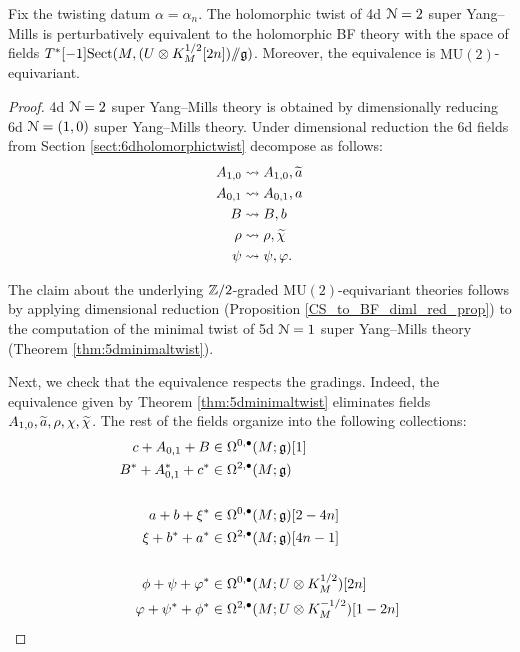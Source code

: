 \documentclass[10pt, oneside]{article}
\newcommand{\MU}{\mathrm{MU}}
\newcommand{\Sect}{\mathrm{Sect}}
\newcommand{\ham}{/\!\!/}
\begin{document}
\begin{theorem}
Fix the twisting datum $\alpha = \alpha_n$. The holomorphic twist of 4d $\cN=2$ super Yang--Mills is perturbatively equivalent to the holomorphic BF theory with the space of fields $T^*[-1] \Sect(M, (U\otimes K_M^{1/2}[2n])\ham \fg)$. Moreover, the equivalence is $\MU(2)$-equivariant.
\label{thm:4dholomorphictwist}
\end{theorem}
\begin{proof}
4d $\cN=2$ super Yang--Mills theory is obtained by dimensionally reducing 6d $\cN=(1,0)$ super Yang--Mills theory. Under dimensional reduction the 6d fields from Section \ref{sect:6dholomorphictwist} decompose as follows:
\begin{align*}
A_{1, 0}&\rightsquigarrow A_{1, 0}, \Tilde{a} \\
A_{0, 1}&\rightsquigarrow A_{0, 1}, a \\
B&\rightsquigarrow B, b \\
\rho&\rightsquigarrow \rho, \Tilde{\chi} \\
\psi & \rightsquigarrow \psi, \varphi . \\
\end{align*}

The claim about the underlying $\ZZ/2$-graded $\MU(2)$-equivariant theories follows by applying dimensional reduction (Proposition \ref{CS_to_BF_diml_red_prop}) to the computation of the minimal twist of 5d $\cN=1$ super Yang--Mills theory (Theorem \ref{thm:5dminimaltwist}).

Next, we check that the equivalence respects  the gradings. Indeed, the equivalence given by Theorem \ref{thm:5dminimaltwist} eliminates fields $A_{1, 0}, \Tilde{a}, \rho, \chi, \Tilde{\chi}$. The rest of the fields organize into the following collections:
\begin{align*}
c+A_{0, 1}+B&\in\Omega^{0, \bullet}(M; \fg)[1] \\
B^*+A^*_{0, 1}+ c^*&\in\Omega^{2, \bullet}(M; \fg) \\
\\
a + b + \xi^*&\in\Omega^{0, \bullet}(M; \fg)[2-4n] \\
\xi + b^* + a^*&\in\Omega^{2, \bullet}(M; \fg)[4n-1] \\
\\
\phi + \psi + \varphi^*&\in\Omega^{0, \bullet}(M; U\otimes K_M^{1/2})[2n] \\
\varphi + \psi^* + \phi^* &\in\Omega^{2, \bullet}(M; U\otimes K_M^{-1/2})[1-2n]
\end{align*}


\end{proof}
\end{document}
